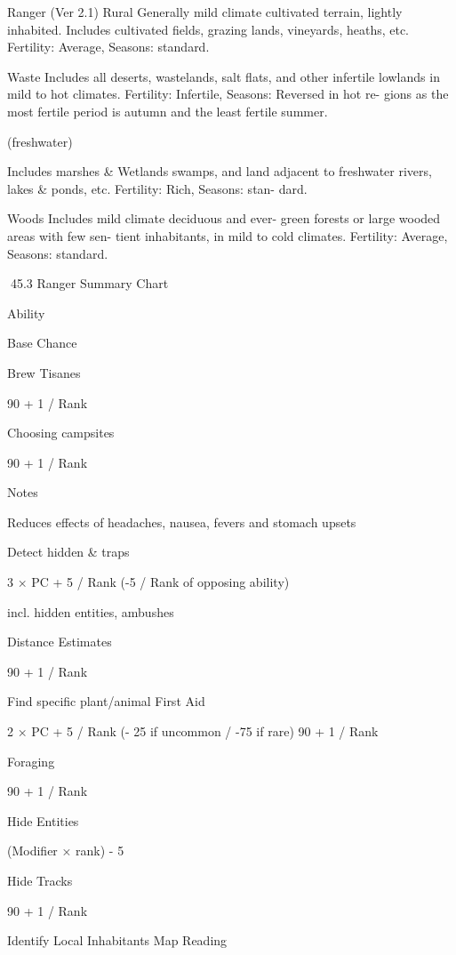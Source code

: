 \begin{Chapter}{Ranger (Ver 2.1)}
Rural  Generally  mild  climate  cultivated  terrain, 
lightly inhabited. Includes cultivated fields, grazing 
lands,  vineyards,  heaths,  etc.  Fertility:  Average, 
Seasons: standard. 

Waste  Includes  all  deserts,  wastelands,  salt  flats, 
and other infertile lowlands in mild to hot climates. 
Fertility:  Infertile,  Seasons:  Reversed  in  hot  re-
gions  as  the  most  fertile  period  is  autumn  and  the 
least fertile summer. 

(freshwater) 

Includes  marshes  \& 
Wetlands 
swamps,  and  land  adjacent  to  freshwater  rivers, 
lakes  \&  ponds,  etc.  Fertility:  Rich,  Seasons:  stan-
dard. 

Woods  Includes mild climate deciduous and ever-
green  forests  or  large  wooded  areas  with  few  sen-
tient inhabitants, in mild to cold climates. Fertility: 
Average, Seasons: standard. 

 

 

45.3 Ranger Summary Chart 

Ability 

Base Chance 

Brew Tisanes 

90 + 1 / Rank 

Choosing campsites 

90 + 1 / Rank 

Notes 

Reduces effects of headaches, 
nausea, fevers and stomach upsets 
 

Detect hidden \& traps 

3 × PC + 5 / Rank (-5 / Rank of opposing ability) 

incl. hidden entities, ambushes 

Distance Estimates 

90 + 1 / Rank 

Find specific 
plant/animal 
First Aid 

2 × PC + 5 / Rank (- 25 if uncommon / -75 if 
rare) 
90 + 1 / Rank 

Foraging 

90 + 1 / Rank 

Hide Entities 

(Modifier × rank) - 5 

Hide Tracks 

90 + 1 / Rank 

Identify Local 
Inhabitants 
Map Reading 


\end{Chapter}
